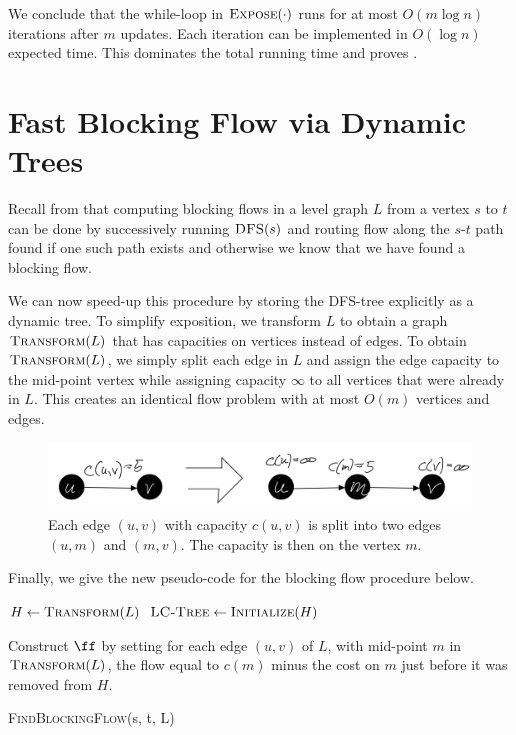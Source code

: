 We conclude that the while-loop in $\textsc{Expose}(\cdot)$ runs for at most $O(m \log n)$ iterations after $m$ updates. Each iteration can be implemented in $O(\log n)$ expected time. This dominates the total running time and proves .

\section{Fast Blocking Flow via Dynamic Trees}

Recall from  that computing blocking flows in a level graph $L$ from a vertex $s$ to $t$ can be done by successively running $\textsc{DFS}(s)$ and routing flow along the $s$-$t$ path found if one such path exists and otherwise we know that we have found a blocking flow. 

We can now speed-up this procedure by storing the DFS-tree explicitly as a dynamic tree. To simplify exposition, we transform $L$ to obtain a graph $\textsc{Transform}(L)$ that has capacities on vertices instead of edges. To obtain $\textsc{Transform}(L)$, we simply split each edge in $L$ and assign the edge capacity to the mid-point vertex while assigning capacity $\infty$ to all vertices that were already in $L$. This creates an identical flow problem with at most $O(m)$ vertices and edges.

\begin{figure}[!ht]
    \centering
    \includegraphics[scale=0.2]{./fig/TransformToVertCaps_lectureDynamicTree.jpeg}
    \caption{Each edge $(u,v)$ with capacity $c(u,v)$ is split into two edges $(u,m)$ and $(m,v)$. The capacity is then on the vertex $m$.}
    \label{fig:my_label}
\end{figure}

Finally, we give the new pseudo-code for the blocking flow procedure below.

\begin{algorithm}[H]
  \SetAlgoLined
  $H \leftarrow \textsc{Transform}(L)$\;
  $\textsc{LC-Tree} \gets \textsc{Initialize}(H)$\;
  
  Construct $\ff$ by setting for each edge $(u,v)$ of $L$, with mid-point $m$ in $\textsc{Transform}(L)$, the flow equal to $c(m)$ minus the cost on $m$ just before it was removed from $H$.
  \caption{\textsc{FindBlockingFlow}(s, t, L)}
\end{algorithm}

